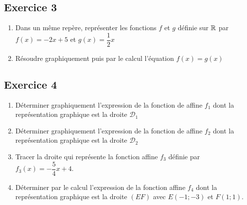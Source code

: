 \documentclass[12pt,a4paper]{article}
\begin{document}
\subsection*{Exercice 3}

\begin{enumerate}
    \item Dans un même repère, représenter les fonctions $f$ et $g$ définie sur $\mathbb{R}$ par $f(x)=-2x+5$ et $g(x)=\dfrac{1}{2}x$
    \item Résoudre graphiquement puis par le calcul l'équation $f(x)=g(x)$
\end{enumerate}

\subsection*{Exercice 4}

\begin{enumerate}
    \item Déterminer graphiquement l'expression de la fonction de affine $f_1$ dont la représentation graphique est la droite $\mathscr{D}{_1}$
    \item Déterminer graphiquement l'expression de la fonction de affine $f_2$ dont la représentation graphique est la droite $\mathscr{D}{_2}$
    \item Tracer la droite qui représente la fonction affine $f_3$ définie par $f_3(x)=-\dfrac{5}{4}x+4$.
    \item Déterminer par le calcul l'expression de la fonction affine $f_4$ dont la représentation graphique est la droite $(EF)$ avec $E(-1;-3)$ et $F(1;1)$.
\end{enumerate}



\begin{center}
\end{center}
\end{document}
